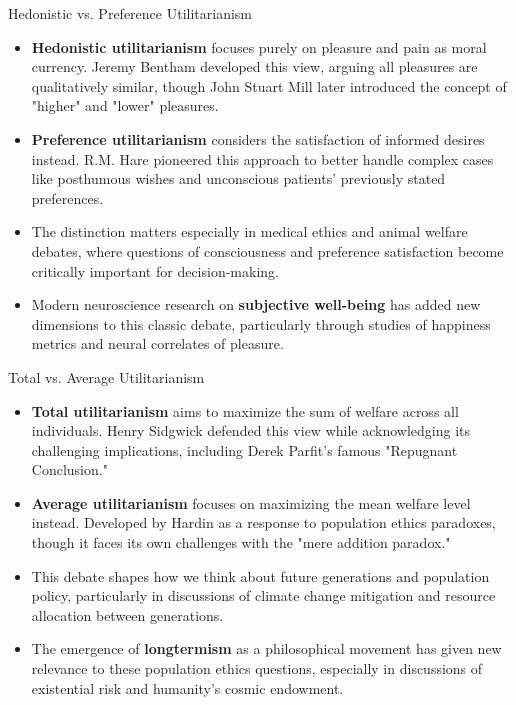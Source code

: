 \documentclass[aspectratio=169]{beamer}
\begin{document}
 \begin{frame}{Hedonistic vs. Preference Utilitarianism}
    \begin{itemize}
        \item \textbf{Hedonistic utilitarianism} focuses purely on pleasure and pain as moral currency. Jeremy Bentham developed this view, arguing all pleasures are qualitatively similar, though John Stuart Mill later introduced the concept of "higher" and "lower" pleasures.
        
        \item \textbf{Preference utilitarianism} considers the satisfaction of informed desires instead. R.M. Hare pioneered this approach to better handle complex cases like posthumous wishes and unconscious patients' previously stated preferences.
        
        \item The distinction matters especially in medical ethics and animal welfare debates, where questions of consciousness and preference satisfaction become critically important for decision-making.
        
        \item Modern neuroscience research on \textbf{subjective well-being} has added new dimensions to this classic debate, particularly through studies of happiness metrics and neural correlates of pleasure.
    \end{itemize}
 \end{frame}
 
 \begin{frame}{Total vs. Average Utilitarianism}
    \begin{itemize}
        \item \textbf{Total utilitarianism} aims to maximize the sum of welfare across all individuals. Henry Sidgwick defended this view while acknowledging its challenging implications, including Derek Parfit's famous "Repugnant Conclusion."
        
        \item \textbf{Average utilitarianism} focuses on maximizing the mean welfare level instead. Developed by Hardin as a response to population ethics paradoxes, though it faces its own challenges with the "mere addition paradox."
        
        \item This debate shapes how we think about future generations and population policy, particularly in discussions of climate change mitigation and resource allocation between generations.
        
        \item The emergence of \textbf{longtermism} as a philosophical movement has given new relevance to these population ethics questions, especially in discussions of existential risk and humanity's cosmic endowment.
    \end{itemize}
 \end{frame}
 
\end{document}
